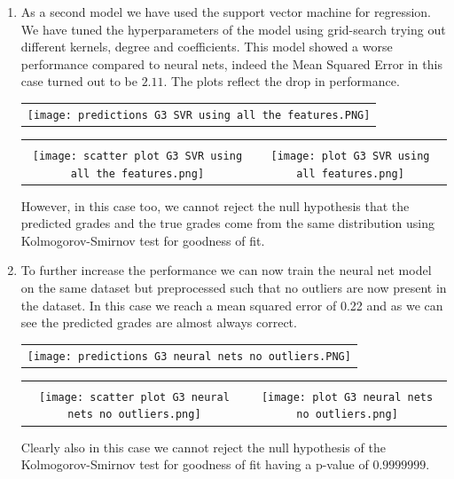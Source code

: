 \documentclass[a4paper, 11pt]{report}
\theoremstyle{definition}
\numberwithin{equation}{section}		%
\numberwithin{figure}{section}			%
\numberwithin{table}{section}				%
\begin{document}
\begin{enumerate}
\item As a second model we have used the support vector machine for regression. We have tuned the hyperparameters of the model using grid-search trying out different kernels, degree and coefficients. This model showed a worse performance compared to neural nets, indeed the Mean Squared Error in this case turned out to be $2.11$. The plots reflect the drop in performance.
\newline
    \begin{frame}
      \centering
        \begin{tabular}{c}
         \\
        \texttt{[image: predictions G3 SVR using all the features.PNG]}
      \end{tabular}

      \vspace{0.05em}
        \begin{tabular}{cc}
          &  \\
        \texttt{[image: scatter plot G3 SVR using all the features.png]}
         &
         \texttt{[image: plot G3 SVR using all features.png]}
         \end{tabular}
    \end{frame}
\newline
However, in this case too, we cannot reject the null hypothesis that the predicted grades and the true grades come from the same distribution using Kolmogorov-Smirnov test for goodness of fit.
\newline
\item To further increase the performance we can now train the neural net model on the same dataset but preprocessed such that no outliers are now present in the dataset. In this case we reach a mean squared error of 0.22 and as we can see the predicted grades are almost always correct.
\newline
    \begin{frame}
      \centering
        \begin{tabular}{c}
         \\
        \texttt{[image: predictions G3 neural nets no outliers.PNG]}
      \end{tabular}

      \vspace{0.05em}
        \begin{tabular}{cc}
          &  \\
        \texttt{[image: scatter plot G3 neural nets no outliers.png]}
         &
         \texttt{[image: plot G3 neural nets no outliers.png]}
         \end{tabular}
    \end{frame}
\newline
Clearly also in this case we cannot reject the null hypothesis of the Kolmogorov-Smirnov test for goodness of fit having a p-value of $0.9999999$.
\end{enumerate}
\end{document}
